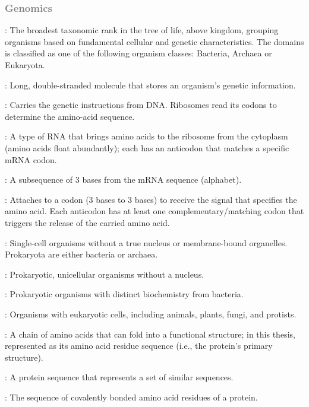 \documentclass[a4paper,12pt]{extarticle}
\begin{document}
  \subsubsection*{%
    \textcolor{gray}{Genomics}
  }
  
  \begin{description}[leftmargin=1.2em]
    \item[Domain \textnormal{or} Superkingdom]: The broadest taxonomic rank in the tree of life, above kingdom, grouping organisms based on fundamental cellular and genetic characteristics. The domains is classified as one of the following organism classes: Bacteria, Archaea or Eukaryota.
    \item[DNA]: Long, double-stranded molecule that stores an organism's genetic information.
    \item[mRNA]: Carries the genetic instructions from DNA. Ribosomes read its codons to determine the amino-acid sequence.
    \item[tRNA]: A type of RNA that brings amino acids to the ribosome from the cytoplasm (amino acids float abundantly); each has an anticodon that matches a specific mRNA codon.
    \item[Codon]: A subsequence of 3 bases from the mRNA sequence (alphabet).
    \item[Anticodon]: Attaches to a codon (3 bases to 3 bases) to receive the signal that specifies the amino acid. Each anticodon has at least one complementary/matching codon that triggers the release of the carried amino acid.
    \item[Prokaryota]: Single-cell organisms without a true nucleus or membrane-bound organelles. Prokaryota are either bacteria or archaea.
    \item[Bacteria]: Prokaryotic, unicellular organisms without a nucleus.
    \item[Archaea]: Prokaryotic organisms with distinct biochemistry from bacteria.
    \item[Eukaryota]: Organisms with eukaryotic cells, including animals, plants, fungi, and protists.
    \item[Protein (Sequence)]: A chain of amino acids that can fold into a functional structure; in this thesis, represented as its amino acid residue sequence (i.e., the protein's primary structure).
    \item[Reference Protein Sequence]: A protein sequence that represents a set of similar sequences.
    \item[Protein Primary Structure]: The sequence of covalently bonded amino acid residues of a protein.

\end{description}
\end{document}
